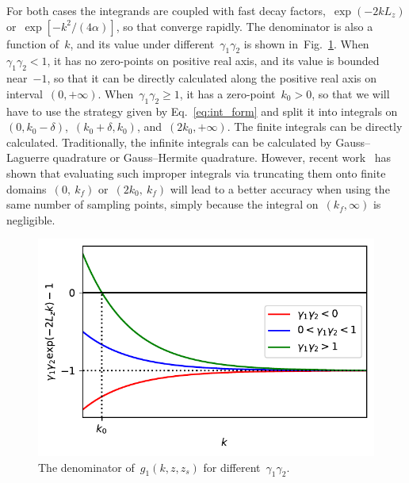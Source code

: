 \documentclass[aps,prl,reprint,showpacs,floatfix,superscriptaddress, onecolumn]{revtex4-2}
\begin{document}
For both cases the integrands are coupled with fast decay factors,~$\exp{(-2 k L_z)}$ or~$\exp{\left[-k^2 / (4 \alpha)\right]}$, so that converge rapidly.
The denominator is also a function of~$k$, and its value under different~$\gamma_1 \gamma_2$ is shown in~Fig.~\ref{fig:beta}.
When~$\gamma_1 \gamma_2 < 1$, it has no zero-points on positive real axis, and its value is bounded near~$-1$, so that it can be directly calculated along the positive real axis on interval~$(0, +\infty)$.
When~$\gamma_1 \gamma_2 \geq 1$, it has a zero-point~$k_0 > 0$, so that we will have to use the strategy given by Eq.~\eqref{eq:int_form} and split it into integrals on~$(0, k_0 - \delta)$,~$(k_0 + \delta, k_0)$, and~$(2 k_0, +\infty)$.
The finite integrals can be directly calculated.
Traditionally, the infinite integrals can be calculated by Gauss–Laguerre quadrature or Gauss–Hermite quadrature.
However, recent work~\cite{trefethen2022exactness} has shown that evaluating such improper integrals via truncating them onto finite domains~$(0,~k_f)$ or~$(2k_0,~k_f)$ will lead to a better accuracy when using the same number of sampling points, simply because the integral on~$(k_f, \infty)$ is negligible.

\begin{figure}[htbp]
    \centering
    \includegraphics[width = 0.6 \linewidth]{SIfig/beta.pdf}
    \caption{The denominator of~$g_1(k, z, z_s)$ for different~$\gamma_1 \gamma_2$.}
    \label{fig:beta}
\end{figure}
\end{document}

